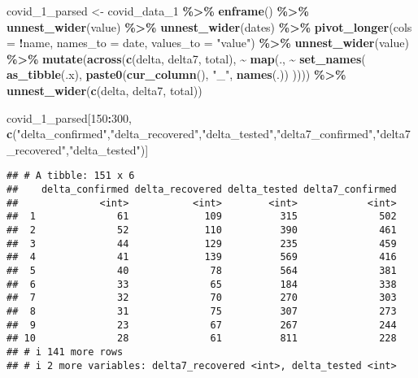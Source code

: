 \documentclass[
]{article}
\newenvironment{Shaded}{\begin{snugshade}}{\end{snugshade}}
\newcommand{\AttributeTok}[1]{\textcolor[rgb]{0.13,0.29,0.53}{#1}}
\newcommand{\DecValTok}[1]{\textcolor[rgb]{0.00,0.00,0.81}{#1}}
\newcommand{\FunctionTok}[1]{\textcolor[rgb]{0.13,0.29,0.53}{\textbf{#1}}}
\newcommand{\NormalTok}[1]{#1}
\newcommand{\OtherTok}[1]{\textcolor[rgb]{0.56,0.35,0.01}{#1}}
\newcommand{\SpecialCharTok}[1]{\textcolor[rgb]{0.81,0.36,0.00}{\textbf{#1}}}
\newcommand{\StringTok}[1]{\textcolor[rgb]{0.31,0.60,0.02}{#1}}
\begin{document}
\begin{Shaded}
\begin{Highlighting}[]
\NormalTok{covid\_1\_parsed }\OtherTok{\textless{}{-}}
\NormalTok{  covid\_data\_1 }\SpecialCharTok{\%\textgreater{}\%} \FunctionTok{enframe}\NormalTok{() }\SpecialCharTok{\%\textgreater{}\%} \FunctionTok{unnest\_wider}\NormalTok{(value) }\SpecialCharTok{\%\textgreater{}\%} \FunctionTok{unnest\_wider}\NormalTok{(dates) }\SpecialCharTok{\%\textgreater{}\%}
  \FunctionTok{pivot\_longer}\NormalTok{(}\AttributeTok{cols =} \SpecialCharTok{!}\NormalTok{name,}
               \AttributeTok{names\_to =} \StringTok{\textquotesingle{}date\textquotesingle{}}\NormalTok{,}
               \AttributeTok{values\_to =} \StringTok{"value"}\NormalTok{) }\SpecialCharTok{\%\textgreater{}\%} \FunctionTok{unnest\_wider}\NormalTok{(value) }\SpecialCharTok{\%\textgreater{}\%}
  \FunctionTok{mutate}\NormalTok{(}\FunctionTok{across}\NormalTok{(}\FunctionTok{c}\NormalTok{(delta, delta7, total), }\SpecialCharTok{\textasciitilde{}} \FunctionTok{map}\NormalTok{(., }\SpecialCharTok{\textasciitilde{}} \FunctionTok{set\_names}\NormalTok{(}
    \FunctionTok{as\_tibble}\NormalTok{(.x), }\FunctionTok{paste0}\NormalTok{(}\FunctionTok{cur\_column}\NormalTok{(), }\StringTok{"\_"}\NormalTok{, }\FunctionTok{names}\NormalTok{(.))}
\NormalTok{  )))) }\SpecialCharTok{\%\textgreater{}\%}
  \FunctionTok{unnest\_wider}\NormalTok{(}\FunctionTok{c}\NormalTok{(delta, delta7, total))}

\NormalTok{covid\_1\_parsed[}\DecValTok{150}\SpecialCharTok{:}\DecValTok{300}\NormalTok{, }\FunctionTok{c}\NormalTok{(}\StringTok{"delta\_confirmed"}\NormalTok{,}\StringTok{"delta\_recovered"}\NormalTok{,}\StringTok{"delta\_tested"}\NormalTok{,}\StringTok{"delta7\_confirmed"}\NormalTok{,}\StringTok{"delta7\_recovered"}\NormalTok{,}\StringTok{"delta\_tested"}\NormalTok{)]}
\end{Highlighting}
\end{Shaded}

\begin{verbatim}
## # A tibble: 151 x 6
##    delta_confirmed delta_recovered delta_tested delta7_confirmed
##              <int>           <int>        <int>            <int>
##  1              61             109          315              502
##  2              52             110          390              461
##  3              44             129          235              459
##  4              41             139          569              416
##  5              40              78          564              381
##  6              33              65          184              338
##  7              32              70          270              303
##  8              31              75          307              273
##  9              23              67          267              244
## 10              28              61          811              228
## # i 141 more rows
## # i 2 more variables: delta7_recovered <int>, delta_tested <int>
\end{verbatim}
\end{document}
